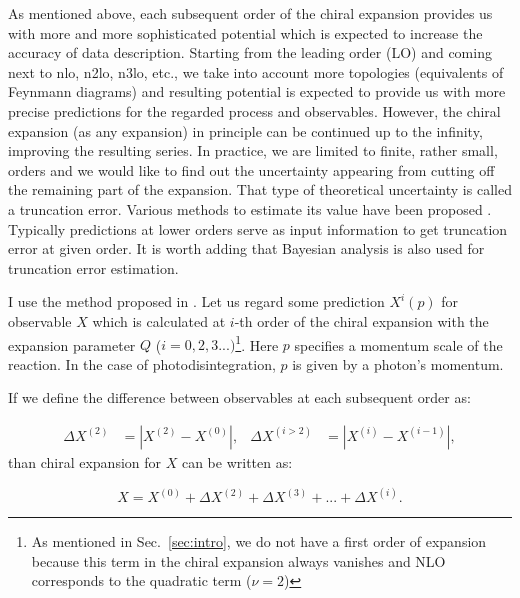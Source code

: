     As mentioned above, each subsequent order of the chiral
    expansion provides us with more and more sophisticated
    potential which is expected to increase the accuracy of data description.
    Starting from the leading order (LO) and coming next to
    \gls{nlo}, \gls{n2lo}, \gls{n3lo}, etc., we take into account more topologies (equivalents of Feynmann diagrams) 
    and resulting potential is expected to provide us with more precise predictions
    for the regarded process and observables. However, the chiral expansion (as any expansion) 
    in principle can be continued up to the infinity, improving the resulting series.
    In practice, we are limited to finite, rather small, orders 
    and we would like to find out
    the uncertainty appearing from cutting off the remaining part of the expansion.
    That type of theoretical uncertainty is called a truncation error. 
    Various methods to estimate its value
    have been proposed \cite{Epelbaum2014SCS, Epelbaum2015_trunc, Binder2015, Epelbaum_pos, Miller_arxiv}.
    Typically predictions at lower orders serve as input information to get truncation error at given order.
    It is worth adding that Bayesian analysis is also used for truncation error estimation.

    I use the method proposed in \cite{Binder2015}.
    Let us regard some prediction $X^i(p)$ for observable $X$ which is calculated
    at $i$-th order of the chiral expansion 
    with the expansion parameter $Q$ ($i = 0,2,3...)$\footnote{As mentioned in Sec.~\ref{sec:intro}, we do not have a first order of expansion
    because this term in the chiral expansion always vanishes
    and NLO  corresponds to the quadratic term ($\nu=2$)}.
    Here $p$ specifies a momentum
    scale of the reaction. In the case of photodisintegration, $p$ is given by a
    photon's momentum.  

    If we define the difference between observables at each subsequent order as:

    \begin{align}
        \Delta X^{(2)} &= |X^{(2)} - X^{(0)}|,& \Delta X^{(i>2)} &= |X^{(i)} - X^{(i-1)}|,
    \end{align}
    than chiral expansion for $X$ can be written as:

    \begin{equation}
        X = X^{(0)} + \Delta X^{(2)} + \Delta X^{(3)} + ... + \Delta X^{(i)}.
        \label{trunc1}
    \end{equation}
        
